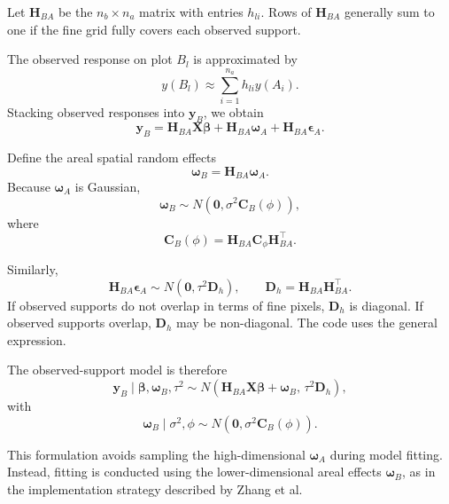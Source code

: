 \documentclass[11pt]{article}
\newcommand{\bsy}{\bm{y}}
\newcommand{\bsb}{\bm{\beta}}
\newcommand{\bsw}{\bm{\omega}}
\newcommand{\bse}{\bm{\epsilon}}
\begin{document}
Let $\bm{H}_{BA}$ be the $n_b \times n_a$ matrix with entries $h_{li}$. Rows of $\bm{H}_{BA}$ generally sum to one if the fine grid fully covers each observed support.

The observed response on plot $B_l$ is approximated by
\begin{equation}
y(B_l)
\approx
\sum_{i=1}^{n_a} h_{li} y(A_i).
\label{eq:areal_average}
\end{equation}
Stacking observed responses into $\bsy_B$, we obtain
\begin{equation}
\bsy_B
=
\bm{H}_{BA}\bm{X}\bsb
+
\bm{H}_{BA}\bsw_A
+
\bm{H}_{BA}\bse_A.
\label{eq:yB_fine_stack}
\end{equation}

Define the areal spatial random effects
\begin{equation}
\bsw_B = \bm{H}_{BA}\bsw_A.
\label{eq:wB_def}
\end{equation}
Because $\bsw_A$ is Gaussian,
\begin{equation}
\bsw_B \sim N(\bm{0},\sigma^2\bm{C}_B(\phi)),
\label{eq:wB_prior}
\end{equation}
where
\begin{equation}
\bm{C}_B(\phi)
=
\bm{H}_{BA}\bm{C}_{\phi}\bm{H}_{BA}^\top.
\label{eq:CB_full}
\end{equation}

Similarly,
\begin{equation}
\bm{H}_{BA}\bse_A
\sim
N(\bm{0},\tau^2 \bm{D}_h),
\qquad
\bm{D}_h = \bm{H}_{BA}\bm{H}_{BA}^\top.
\label{eq:Dh}
\end{equation}
If observed supports do not overlap in terms of fine pixels, $\bm{D}_h$ is diagonal. If observed supports overlap, $\bm{D}_h$ may be non-diagonal. The code uses the general expression.

The observed-support model is therefore
\begin{equation}
\bsy_B \mid \bsb,\bsw_B,\tau^2
\sim
N\left(
\bm{H}_{BA}\bm{X}\bsb+\bsw_B,\,
\tau^2\bm{D}_h
\right),
\label{eq:yB_conditional}
\end{equation}
with
\begin{equation}
\bsw_B\mid \sigma^2,\phi
\sim
N\left(\bm{0},\sigma^2\bm{C}_B(\phi)\right).
\label{eq:wB_conditional}
\end{equation}

This formulation avoids sampling the high-dimensional $\bsw_A$ during model fitting. Instead, fitting is conducted using the lower-dimensional areal effects $\bsw_B$, as in the implementation strategy described by Zhang et al.
\end{document}
